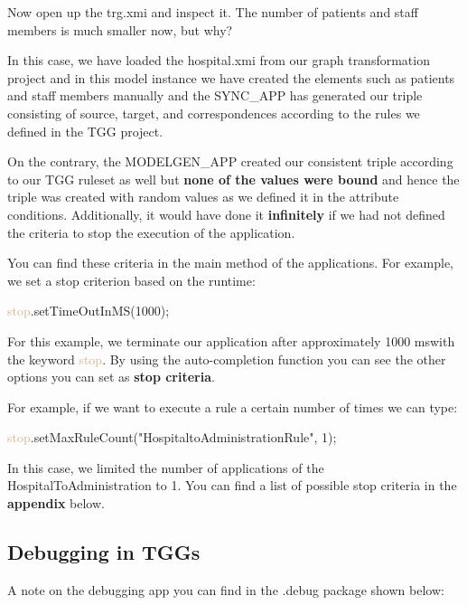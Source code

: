 {Now open up the \textsf{trg.xmi} and inspect it. The number of patients and staff members is much smaller now, but why?

In this case, we have loaded the \textsf{hospital.xmi} from our graph transformation project and in this model instance we have created the elements such as patients and staff members manually and the SYNC\_APP has generated our triple consisting of source, target, and correspondences according to the rules we defined in the TGG project. 

On the contrary, the MODELGEN\_APP created our consistent triple according to our TGG ruleset as well but \textbf{none of the values were bound} and hence the triple was created with random values as we defined it in the attribute conditions. Additionally, it would have done it \textbf{infinitely} if we had not defined the criteria to stop the execution of the application.\newline

You can find these criteria in the main method of the applications. For example, we set a stop criterion based on the runtime:\newline

\textcolor{Tan}{stop}.setTimeOutInMS(1000);\newline

For this example, we terminate our application after approximately \textsf{1000 ms}with the keyword \textcolor{Tan}{stop}. By using the auto-completion function you can see the other options you can set as \textbf{stop criteria}.

For example, if we want to execute a rule a certain number of times we can type:\newline

\textcolor{Tan}{stop}.setMaxRuleCount("HospitaltoAdministrationRule", 1); \newline

In this case, we limited the number of applications of the HospitalToAdministration to 1. You can find a list of possible stop criteria in the \textbf{appendix} below.

\clearpage

\subsection{ Debugging in TGGs}

A note on the debugging app you can find in the \textsf{.debug} package shown below:\newline

}
